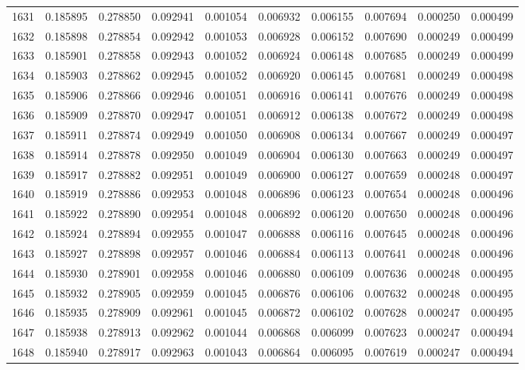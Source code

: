 \begin{tabular}{lrrrrrrrrr}
1631 & 0.185895 & 0.278850 & 0.092941 & 0.001054 & 0.006932 & 0.006155 & 0.007694 & 0.000250 & 0.000499 \\
1632 & 0.185898 & 0.278854 & 0.092942 & 0.001053 & 0.006928 & 0.006152 & 0.007690 & 0.000249 & 0.000499 \\
1633 & 0.185901 & 0.278858 & 0.092943 & 0.001052 & 0.006924 & 0.006148 & 0.007685 & 0.000249 & 0.000499 \\
1634 & 0.185903 & 0.278862 & 0.092945 & 0.001052 & 0.006920 & 0.006145 & 0.007681 & 0.000249 & 0.000498 \\
1635 & 0.185906 & 0.278866 & 0.092946 & 0.001051 & 0.006916 & 0.006141 & 0.007676 & 0.000249 & 0.000498 \\
1636 & 0.185909 & 0.278870 & 0.092947 & 0.001051 & 0.006912 & 0.006138 & 0.007672 & 0.000249 & 0.000498 \\
1637 & 0.185911 & 0.278874 & 0.092949 & 0.001050 & 0.006908 & 0.006134 & 0.007667 & 0.000249 & 0.000497 \\
1638 & 0.185914 & 0.278878 & 0.092950 & 0.001049 & 0.006904 & 0.006130 & 0.007663 & 0.000249 & 0.000497 \\
1639 & 0.185917 & 0.278882 & 0.092951 & 0.001049 & 0.006900 & 0.006127 & 0.007659 & 0.000248 & 0.000497 \\
1640 & 0.185919 & 0.278886 & 0.092953 & 0.001048 & 0.006896 & 0.006123 & 0.007654 & 0.000248 & 0.000496 \\
1641 & 0.185922 & 0.278890 & 0.092954 & 0.001048 & 0.006892 & 0.006120 & 0.007650 & 0.000248 & 0.000496 \\
1642 & 0.185924 & 0.278894 & 0.092955 & 0.001047 & 0.006888 & 0.006116 & 0.007645 & 0.000248 & 0.000496 \\
1643 & 0.185927 & 0.278898 & 0.092957 & 0.001046 & 0.006884 & 0.006113 & 0.007641 & 0.000248 & 0.000496 \\
1644 & 0.185930 & 0.278901 & 0.092958 & 0.001046 & 0.006880 & 0.006109 & 0.007636 & 0.000248 & 0.000495 \\
1645 & 0.185932 & 0.278905 & 0.092959 & 0.001045 & 0.006876 & 0.006106 & 0.007632 & 0.000248 & 0.000495 \\
1646 & 0.185935 & 0.278909 & 0.092961 & 0.001045 & 0.006872 & 0.006102 & 0.007628 & 0.000247 & 0.000495 \\
1647 & 0.185938 & 0.278913 & 0.092962 & 0.001044 & 0.006868 & 0.006099 & 0.007623 & 0.000247 & 0.000494 \\
1648 & 0.185940 & 0.278917 & 0.092963 & 0.001043 & 0.006864 & 0.006095 & 0.007619 & 0.000247 & 0.000494 \\

\end{tabular}
